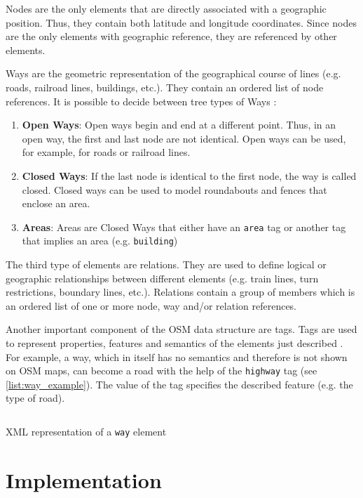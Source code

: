 \documentclass[conference]{IEEEtran}
\begin{document}
Nodes are the only elements that are directly associated with a geographic position. Thus, they contain both latitude and longitude coordinates. Since nodes are the only elements with geographic reference, they are referenced by other elements. 

Ways are the geometric representation of the geographical course of lines (e.g. roads, railroad lines, buildings, etc.). They contain an ordered list of node references. It is possible to decide between tree types of Ways \cite{osm_ways}: 
\begin{enumerate}
    \item \textbf{Open Ways}: Open ways begin and end at a different point. Thus, in an open way, the first and last node are not identical. Open ways can be used, for example, for roads or railroad lines.
    \item \textbf{Closed Ways}: If the last node is identical to the first node, the way is called closed. Closed ways can be used to model roundabouts and fences that enclose an area. 
    \item \textbf{Areas}: Areas are Closed Ways that either have an \texttt{area} tag or another tag that implies an area (e.g. \texttt{building})
\end{enumerate}
The third type of elements are relations. They are used to define logical or geographic relationships between different elements (e.g. train lines, turn restrictions, boundary lines, etc.). Relations contain a group of members which is an ordered list of one or more node, way and/or relation references. \cite{osm_relations}


Another important component of the OSM data structure are tags. Tags are used to represent properties, features and semantics of the elements just described \cite{osm_tags}. For example, a way, which in itself has no semantics and therefore is not shown on OSM maps, can become a road with the help of the \texttt{highway} tag (see \autoref{list:way_example}). The value of the tag specifies the described feature (e.g. the type of road). 

\begin{listing}[h]
    \inputminted{xml}{listings/way.xml}
    \caption{XML representation of a \texttt{way} element}
    \label{list:way_example}
\end{listing}
\section{Implementation}
\label{sec:Implementation}
\end{document}
